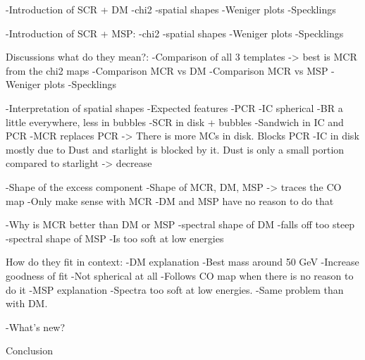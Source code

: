 	-Introduction of SCR + DM
		-chi2
		-spatial shapes	
		-Weniger plots
		-Specklings

	-Introduction of SCR + MSP:
		-chi2
		-spatial shapes
		-Weniger plots
		-Specklings


Discussions what do they mean?:
	-Comparison of all 3 templates -> best is MCR from the chi2 maps
		-Comparison MCR vs DM
		-Comparison MCR vs MSP
		-Weniger plots
		-Specklings
	
	-Interpretation of spatial shapes
		-Expected features
			-PCR			
			-IC spherical
			-BR a little everywhere, less in bubbles			
			-SCR in disk + bubbles
		-Sandwich in IC and PCR
			-MCR replaces PCR -> There is more MCs in disk. Blocks PCR
			-IC in disk mostly due to Dust and starlight is blocked by it. Dust is only a small portion compared to starlight -> decrease
		
		-Shape of the excess component		
			-Shape of MCR, DM, MSP -> traces the CO map
			-Only make sense with MCR
			-DM and MSP have no reason to do that

	
	-Why is MCR better than DM or MSP
		-spectral shape of DM
			-falls off too steep
		-spectral shape of MSP
			-Is too soft at low energies


How do they fit in context:
	-DM explanation
		-Best mass around 50 GeV
		-Increase goodness of fit
		-Not spherical at all
		-Follows CO map when there is no reason to do it
	-MSP explanation
		-Spectra too soft at low energies.
		-Same problem than with DM.
		
	-What's new?
		

Conclusion

